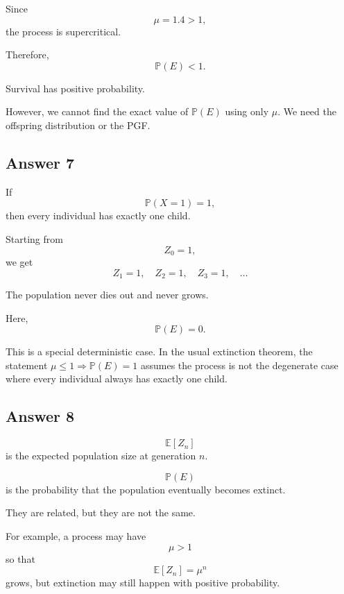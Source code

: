 \documentclass[12pt,a4paper]{article}
\theoremstyle{notestyle}
\newcommand{\Prob}{\mathbb{P}}
\newcommand{\E}{\mathbb{E}}
\begin{document}
Since
\[
\mu=1.4>1,
\]
the process is supercritical.

Therefore,
\[
\boxed{\Prob(E)<1.}
\]

Survival has positive probability.

However, we cannot find the exact value of $\Prob(E)$ using only $\mu$. We need the offspring distribution or the PGF.

\subsection*{Answer 7}

If
\[
\Prob(X=1)=1,
\]
then every individual has exactly one child.

Starting from
\[
Z_0=1,
\]
we get
\[
Z_1=1,\quad Z_2=1,\quad Z_3=1,\quad \ldots
\]

The population never dies out and never grows.

Here,
\[
\Prob(E)=0.
\]

This is a special deterministic case. In the usual extinction theorem, the statement $\mu\leq1\Rightarrow \Prob(E)=1$ assumes the process is not the degenerate case where every individual always has exactly one child.

\subsection*{Answer 8}

\[
\E[Z_n]
\]
is the expected population size at generation $n$.

\[
\Prob(E)
\]
is the probability that the population eventually becomes extinct.

They are related, but they are not the same.

For example, a process may have
\[
\mu>1
\]
so that
\[
\E[Z_n]=\mu^n
\]
grows, but extinction may still happen with positive probability.
\end{document}
